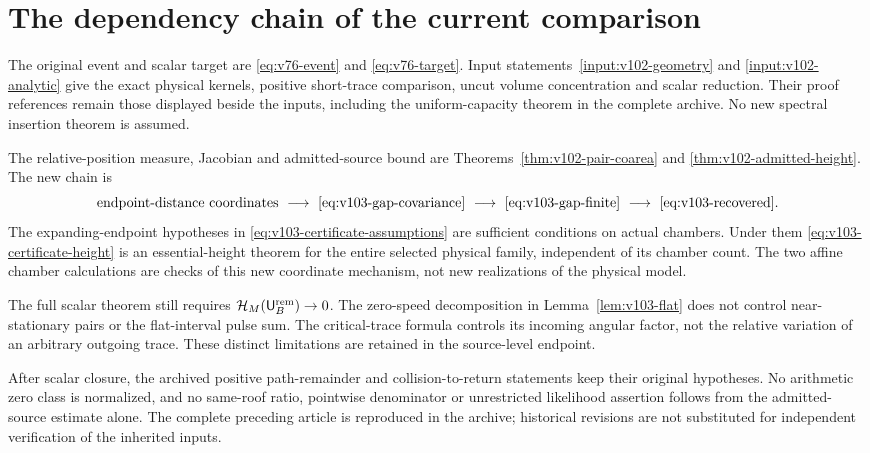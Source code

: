 \section{The dependency chain of the current comparison}
\label{app:v103-dependencies}
The original event and scalar target are \eqref{eq:v76-event} and
\eqref{eq:v76-target}. Input statements~\ref{input:v102-geometry}
and \ref{input:v102-analytic} give the exact physical kernels,
positive short-trace comparison, uncut volume concentration and
scalar reduction. Their proof references remain those displayed
beside the inputs, including the uniform-capacity theorem in the
complete archive. No new spectral insertion theorem is assumed.

The relative-position measure, Jacobian and admitted-source bound
are Theorems~\ref{thm:v102-pair-coarea} and
\ref{thm:v102-admitted-height}. The new chain is
\[
 \text{endpoint-distance coordinates}
 \ \longrightarrow\ \eqref{eq:v103-gap-covariance}
 \ \longrightarrow\ \eqref{eq:v103-gap-finite}
 \ \longrightarrow\ \eqref{eq:v103-recovered}.
\]
The expanding-endpoint hypotheses in
\eqref{eq:v103-certificate-assumptions} are sufficient conditions on
actual chambers. Under them \eqref{eq:v103-certificate-height}
is an essential-height theorem for the entire selected physical
family, independent of its chamber count. The two affine chamber
calculations are checks of this new coordinate mechanism, not new
realizations of the physical model.

The full scalar theorem still requires
$\mathcal H_M(\mathsf U_B^{\rm rem})\to0$.
The zero-speed decomposition in Lemma~\ref{lem:v103-flat} does
not control near-stationary pairs or the flat-interval pulse sum.
The critical-trace formula controls its incoming angular factor, not
the relative variation of an arbitrary outgoing trace. These distinct
limitations are retained in the source-level endpoint.

After scalar closure, the archived positive path-remainder and
collision-to-return statements keep their original hypotheses.
No arithmetic zero class is normalized, and no same-roof ratio,
pointwise denominator or unrestricted likelihood assertion follows
from the admitted-source estimate alone. The complete preceding
article is reproduced in the archive; historical revisions are not
substituted for independent verification of the inherited inputs.
